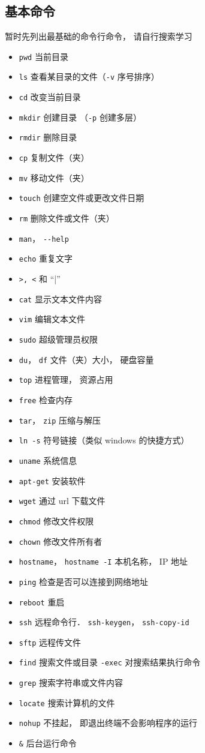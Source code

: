 \subsection{基本命令}

暂时先列出最基础的命令行命令， 请自行搜索学习
\begin{itemize}
\item \verb|pwd| 当前目录
\item \verb|ls| 查看某目录的文件（\verb|-v| 序号排序）
\item \verb|cd| 改变当前目录
\item \verb|mkdir| 创建目录 （\verb|-p| 创建多层）
\item \verb|rmdir| 删除目录
\item \verb|cp| 复制文件（夹）
\item \verb|mv| 移动文件（夹）
\item \verb|touch| 创建空文件或更改文件日期
\item \verb|rm| 删除文件或文件（夹）
\item \verb|man|， \verb|--help|
\item \verb|echo| 重复文字
\item \verb|>, <| 和 “|”
\item \verb|cat| 显示文本文件内容
\item \verb|vim| 编辑文本文件
\item \verb|sudo| 超级管理员权限
\item \verb|du|， \verb|df| 文件（夹）大小， 硬盘容量
\item \verb|top| 进程管理， 资源占用
\item \verb|free| 检查内存
\item \verb|tar|， \verb|zip| 压缩与解压
\item \verb|ln -s| 符号链接（类似 windows 的快捷方式）
\item \verb|uname| 系统信息
\item \verb|apt-get| 安装软件
\item \verb|wget| 通过 url 下载文件
\item \verb|chmod| 修改文件权限
\item \verb|chown| 修改文件所有者
\item \verb|hostname|， \verb|hostname -I| 本机名称， IP 地址
\item \verb|ping| 检查是否可以连接到网络地址
\item \verb|reboot| 重启
\item \verb|ssh| 远程命令行． \verb|ssh-keygen|， \verb|ssh-copy-id|
\item \verb|sftp| 远程传文件
\item \verb|find| 搜索文件或目录 \verb|-exec| 对搜索结果执行命令
\item \verb|grep| 搜索字符串或文件内容
\item \verb|locate| 搜索计算机的文件
\item \verb|nohup| 不挂起， 即退出终端不会影响程序的运行
\item \verb|&| 后台运行命令
\end{itemize}

